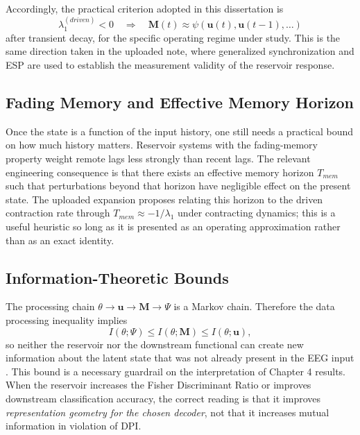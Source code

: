 Accordingly, the practical criterion adopted in this dissertation is
\begin{equation}
\lambda_1^{(driven)} < 0 \quad \Longrightarrow \quad \mathbf{M}(t) \approx \psi(\mathbf{u}(t),\mathbf{u}(t-1),\ldots)
\end{equation}
after transient decay, for the specific operating regime under study. This is the same direction taken in the uploaded note, where generalized synchronization and ESP are used to establish the measurement validity of the reservoir response.

\subsection{Fading Memory and Effective Memory Horizon}

Once the state is a function of the input history, one still needs a practical bound on how much history matters. Reservoir systems with the fading-memory property weight remote lags less strongly than recent lags. The relevant engineering consequence is that there exists an effective memory horizon $T_{mem}$ such that perturbations beyond that horizon have negligible effect on the present state. The uploaded expansion proposes relating this horizon to the driven contraction rate through $T_{mem}\approx -1/\lambda_1$ under contracting dynamics; this is a useful heuristic so long as it is presented as an operating approximation rather than as an exact identity.

\subsection{Information-Theoretic Bounds}

The processing chain $\theta \rightarrow \mathbf{u} \rightarrow \mathbf{M} \rightarrow \Psi$ is a Markov chain. Therefore the data processing inequality implies
\begin{equation}
I(\theta;\Psi)\leq I(\theta;\mathbf{M})\leq I(\theta;\mathbf{u}),
\end{equation}
so neither the reservoir nor the downstream functional can create new information about the latent state that was not already present in the EEG input \cite{cover_elements_2006}. This bound is a necessary guardrail on the interpretation of Chapter 4 results. When the reservoir increases the Fisher Discriminant Ratio or improves downstream classification accuracy, the correct reading is that it improves \emph{representation geometry for the chosen decoder}, not that it increases mutual information in violation of DPI.

